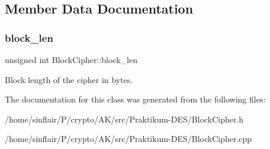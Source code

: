 \subsection{Member Data Documentation}
\mbox{\label{classBlockCipher_ab29ee03262fd620cd0659e860972faf0}} 
\subsubsection{\texorpdfstring{block\+\_\+len}{block\_len}}
{\footnotesize\ttfamily unsigned int Block\+Cipher\+::block\+\_\+len\hspace{0.3cm}{\ttfamily [protected]}}

Block length of the cipher in bytes. 

The documentation for this class was generated from the following files\+:\begin{DoxyCompactItemize}
\item 
/home/sinflair/\+P/crypto/\+A\+K/src/\+Praktikum-\/\+D\+E\+S/Block\+Cipher.\+h\item 
/home/sinflair/\+P/crypto/\+A\+K/src/\+Praktikum-\/\+D\+E\+S/Block\+Cipher.\+cpp\end{DoxyCompactItemize}
